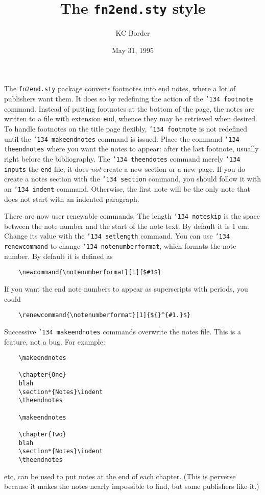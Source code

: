 \documentclass{article}
\title{The {\tt fn2end.sty} style}
\author{KC Border}
\date{May 31, 1995}
\newcommand{\cs}[1]{\mbox{\tt\bs#1}}%
\newcommand{\bs}{\char '134 }   %
\newcommand{\file}[1]{\mbox{\tt #1}}
\begin{document}
\maketitle

The \file{fn2end.sty} package converts footnotes into
end notes, where a lot of publishers want them.  It
does so by redefining the action of the \cs{footnote}
command.  Instead of putting footnotes at the bottom
of the page, the notes are written to a file with
extension \file{end}, whence they may be retrieved
when desired.  To handle footnotes on the title page
flexibly, \cs{footnote} is not redefined until the
\cs{makeendnotes} command is issued.  Place the
command \cs{theendnotes} where you want the notes
to appear: after the last footnote, usually right
before the bibliography.  The \cs{theendotes} command
merely \cs{inputs} the \file{end} file, it does {\em
not} create a new section or a new page. If you do
create a notes section with the \cs{section} command,
you should follow it with an \cs{indent} command.
Otherwise, the first note will be the only note that
does not start with an indented paragraph.

There are now user renewable commands.  The length
\cs{noteskip} is the space between the note number
and the start of the note text. By default it is 1
em.  Change its value with the \cs{setlength} command.
You can use  \cs{renewcommand} to change
\cs{notenumberformat}, which formats the note number.
By default it is defined as
\begin{verbatim}
    \newcommand{\notenumberformat}[1]{$#1$}
\end{verbatim}
If you want the end note numbers to appear as
superscripts with periods, you could
\begin{verbatim}
    \renewcommand{\notenumberformat}[1]{${}^{#1.}$}
\end{verbatim}

Successive \cs{makeendnotes} commands overwrite the
notes file.  This is a feature, not a bug.  For
example:
\begin{verbatim}
    \makeendnotes

    \chapter{One}
    blah
    \section*{Notes}\indent
    \theendnotes

    \makeendnotes

    \chapter{Two}
    blah
    \section*{Notes}\indent
    \theendnotes
\end{verbatim}
etc, can be used to put notes at the end of each
chapter.  (This is perverse because it makes the
notes nearly impossible to find, but some publishers
like it.)
\end{document}
